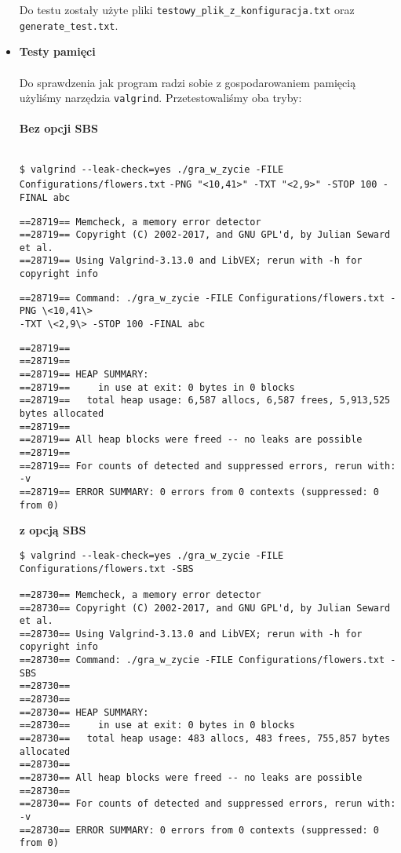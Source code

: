 \documentclass[12pt,a4paper,notitlepage]{report}
\begin{document}
\begin{itemize}
Do testu zostały użyte pliki \verb|testowy_plik_z_konfiguracja.txt| oraz\\ \verb|generate_test.txt|.\\

\item\textbf {Testy pamięci}\\
\\
Do sprawdzenia jak program radzi sobie z gospodarowaniem pamięcią użyliśmy narzędzia \verb|valgrind|. Przetestowaliśmy oba tryby:
\\
\\
\textbf{Bez opcji SBS}\\
\\
\small{
\verb|$ valgrind --leak-check=yes ./gra_w_zycie -FILE Configurations/flowers.txt|
\verb|-PNG "<10,41>" -TXT "<2,9>" -STOP 100 -FINAL abc|
\begin{verbatim}
==28719== Memcheck, a memory error detector
==28719== Copyright (C) 2002-2017, and GNU GPL'd, by Julian Seward et al.
==28719== Using Valgrind-3.13.0 and LibVEX; rerun with -h for copyright info
\end{verbatim}}
\verb|==28719== Command: ./gra_w_zycie -FILE Configurations/flowers.txt -PNG \<10,41\>|\\
\verb|-TXT \<2,9\> -STOP 100 -FINAL abc|
\begin{verbatim}
==28719==
==28719==
==28719== HEAP SUMMARY:
==28719==     in use at exit: 0 bytes in 0 blocks
==28719==   total heap usage: 6,587 allocs, 6,587 frees, 5,913,525 bytes allocated
==28719==
==28719== All heap blocks were freed -- no leaks are possible
==28719==
==28719== For counts of detected and suppressed errors, rerun with: -v
==28719== ERROR SUMMARY: 0 errors from 0 contexts (suppressed: 0 from 0)
\end{verbatim}

\large\textbf{z opcją SBS}
\small{
\begin{verbatim}
$ valgrind --leak-check=yes ./gra_w_zycie -FILE Configurations/flowers.txt -SBS

==28730== Memcheck, a memory error detector
==28730== Copyright (C) 2002-2017, and GNU GPL'd, by Julian Seward et al.
==28730== Using Valgrind-3.13.0 and LibVEX; rerun with -h for copyright info
==28730== Command: ./gra_w_zycie -FILE Configurations/flowers.txt -SBS
==28730==
==28730==
==28730== HEAP SUMMARY:
==28730==     in use at exit: 0 bytes in 0 blocks
==28730==   total heap usage: 483 allocs, 483 frees, 755,857 bytes allocated
==28730==
==28730== All heap blocks were freed -- no leaks are possible
==28730==
==28730== For counts of detected and suppressed errors, rerun with: -v
==28730== ERROR SUMMARY: 0 errors from 0 contexts (suppressed: 0 from 0)


\end{verbatim}}
\end{itemize}
\end{document}
